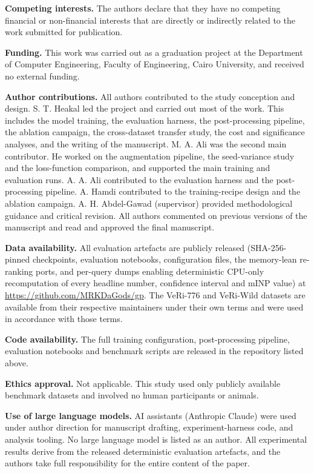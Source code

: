 \noindent\textbf{Competing interests.} The authors declare that they have no
competing financial or non-financial interests that are directly or indirectly
related to the work submitted for publication.

\medskip\noindent\textbf{Funding.} This work was carried out as a graduation
project at the Department of Computer Engineering, Faculty of Engineering,
Cairo University, and received no external funding.

\medskip\noindent\textbf{Author contributions.} All authors contributed to the
study conception and design. S. T. Heakal led the project and carried out most
of the work. This includes the model training, the evaluation harness, the
post-processing pipeline, the ablation campaign, the cross-dataset transfer
study, the cost and significance analyses, and the writing of the manuscript.
M. A. Ali was the second main contributor. He worked on the augmentation
pipeline, the seed-variance study and the loss-function comparison, and
supported the main training and evaluation runs. A. A. Ali contributed to the
evaluation harness and the post-processing pipeline. A. Hamdi contributed to
the training-recipe design and the ablation campaign. A. H. Abdel-Gawad
(supervisor) provided methodological guidance and critical revision. All
authors commented on previous versions of the manuscript and read and approved
the final manuscript.

\medskip\noindent\textbf{Data availability.} All evaluation artefacts are
publicly released (SHA-256-pinned checkpoints, evaluation notebooks,
configuration files, the memory-lean re-ranking ports, and per-query dumps
enabling deterministic CPU-only recomputation of every headline number,
confidence interval and mINP value) at
\url{https://github.com/MRKDaGods/gp}. The VeRi-776 and VeRi-Wild datasets are
available from their respective maintainers under their own terms and were used
in accordance with those terms.

\medskip\noindent\textbf{Code availability.} The full training configuration,
post-processing pipeline, evaluation notebooks and benchmark scripts are
released in the repository listed above.

\medskip\noindent\textbf{Ethics approval.} Not applicable. This study used only
publicly available benchmark datasets and involved no human participants or
animals.

\medskip\noindent\textbf{Use of large language models.} AI assistants
(Anthropic Claude) were used under author direction for manuscript drafting,
experiment-harness code, and analysis tooling. No large language model is
listed as an author. All experimental results derive from the released
deterministic evaluation artefacts, and the authors take full responsibility
for the entire content of the paper.
